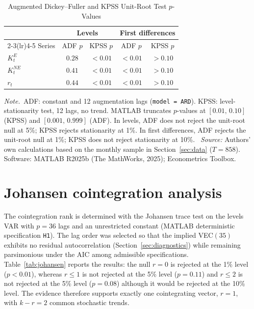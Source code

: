\documentclass[ecta,nameyear,final,supplement]{econsocart}
\numberwithin{equation}{section}
\numberwithin{table}{section}
\theoremstyle{definition}
\newcommand{\KE}{K^{E}}
\newcommand{\KNE}{K^{NE}}
\newcommand{\tabnote}{\par\addvspace{0.4em}\noindent\emph{Note.}}
\newcommand{\tabsource}{\ \textit{Source:} Authors' own calculations based on
the monthly sample in Section~\ref{sec:data} ($T=858$). Software: MATLAB
R2025b (The MathWorks, 2025); Econometrics Toolbox.}
\begin{document}
\begin{table}[t]
\centering
\caption{Augmented Dickey--Fuller and KPSS Unit-Root Test $p$-Values}
\label{tab:unitroot}
\begin{tabular}{lcccc}
\toprule
& \multicolumn{2}{c}{Levels} & \multicolumn{2}{c}{First differences} \\
\cmidrule(lr){2-3}\cmidrule(lr){4-5}
Series & ADF $p$ & KPSS $p$ & ADF $p$ & KPSS $p$ \\
\midrule
$\KE_t$  & $0.28$ & $<0.01$ & $<0.01$ & $>0.10$ \\
$\KNE_t$ & $0.41$ & $<0.01$ & $<0.01$ & $>0.10$ \\
$r_t$    & $0.44$ & $<0.01$ & $<0.01$ & $>0.10$ \\
\bottomrule
\end{tabular}
\tabnote\ ADF: constant and 12 augmentation lags (\texttt{model = ARD}).
KPSS: level-stationarity test, 12 lags, no trend. MATLAB truncates
$p$-values at $[0.01,\,0.10]$ (KPSS) and $[0.001,\,0.999]$ (ADF). In levels,
ADF does not reject the unit-root null at 5\%; KPSS rejects stationarity at
1\%. In first differences, ADF rejects the unit-root null at 1\%; KPSS does
not reject stationarity at 10\%.
\tabsource
\end{table}

\section{Johansen cointegration analysis}
\label{sec:johansen}

The cointegration rank is determined with the Johansen trace test
\citep{Johansen1988} on the levels VAR with $p=36$ lags and an unrestricted
constant (MATLAB deterministic specification \texttt{H1}). The lag order was
selected so that the implied VEC$(35)$ exhibits no residual autocorrelation
(Section~\ref{sec:diagnostics}) while remaining parsimonious under the AIC
among admissible specifications. Table~\ref{tab:johansen} reports the
results: the null $r=0$ is rejected at the 1\% level ($p<0.01$), whereas
$r\le 1$ is not rejected at the 5\% level ($p=0.11$) and $r\le 2$ is not
rejected at the 5\% level ($p=0.08$) although it would be rejected at the
10\% level. The evidence therefore supports exactly one cointegrating vector,
$r=1$, with $k-r=2$ common stochastic trends.
\end{document}
